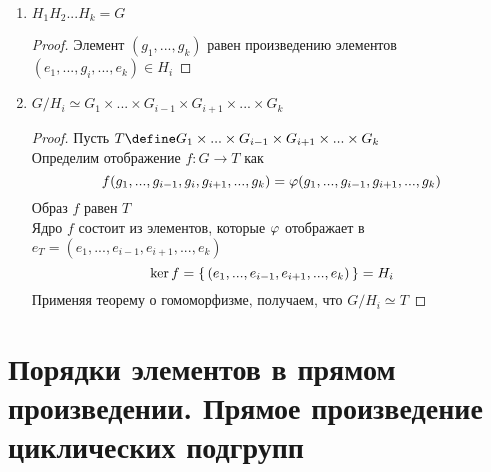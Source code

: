 \begin{properties}
\begin{enumerate}
		\item $ H_1H_2...H_k = G $
		\begin{proof}
			Элемент $ (g_1, ..., g_k) $ равен произведению элементов $ (e_1, ..., g_i, ..., e_k) \in H_i $
		\end{proof}
		\item $ G/H_i \simeq G_1 \times ... \times G_{i - 1} \times G_{i + 1} \times ... \times G_k $
		\begin{proof}
			Пусть $ T \define G_1 \times ... \times G_{i - 1} \times G_{i + 1} \times ... \times G_k $ \\
			Определим отображение $ f : G \to T $ как
			$$ f(g_1, ..., g_{i - 1}, g_i, g_{i + 1}, ..., g_k) = \varphi(g_1, ..., g_{i - 1}, g_{i + 1}, ..., g_k) $$
		Образ $ f $ равен $ T $ \\
		Ядро $ f $ состоит из элементов, которые $ \varphi $ отображает в $ e_T = (e_1, ..., e_{i - 1}, e_{i + 1}, ..., e_k) $
		$$ \ker f = \set{(e_1, ..., e_{i - 1}, e_{i + 1}, ..., e_k)} = H_i $$
		Применяя теорему о гомоморфизме, получаем, что $ G/H_i \simeq T $
		\end{proof}
	\end{enumerate}
\end{properties}

\section{Порядки элементов в прямом произведении. Прямое произведение циклических подгрупп}

